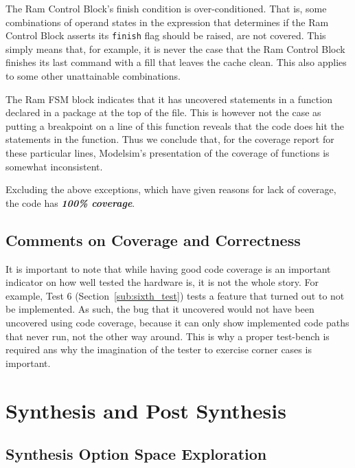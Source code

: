 \documentclass[]{article}
\begin{document}
The Ram Control Block's finish condition is over-conditioned. That is, some combinations of operand states in the expression that determines if the Ram Control Block asserts its \verb"finish" flag should be raised, are not covered. This simply means that, for example, it is never the case that the Ram Control Block finishes its last command with a fill that leaves the cache clean. This also applies to some other unattainable combinations.

The Ram FSM block indicates that it has uncovered statements in a function declared in a package at the top of the file. This is however not the case as putting a breakpoint on a line of this function reveals that the code does hit the statements in the function. Thus we conclude that, for the coverage report for these particular lines, Modelsim's presentation of the coverage of functions is somewhat inconsistent.

Excluding the above exceptions, which have given reasons for lack of coverage, the code has \emph{\textbf{100\% coverage}}.

\subsection{Comments on Coverage and Correctness} %
\label{sub:comments_on_coverage_and_correctness}

It is important to note that while having good code coverage is an important indicator on how well tested the hardware is, it is not the whole story. For example, Test 6 (Section~\ref{sub:sixth_test}) tests a feature that turned out to not be implemented.
As such, the bug that it uncovered would not have been uncovered using code coverage, because it can only show implemented code paths that never run, not the other way around. This is why a proper test-bench is required ans why the imagination of the tester to exercise corner cases is important.



\section{Synthesis and Post Synthesis} %
\label{sec:synthesis_and_post_synthesis}

\subsection{Synthesis Option Space Exploration} %
\end{document}
